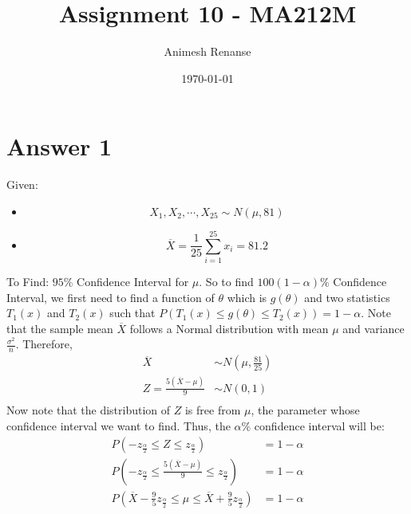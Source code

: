 \documentclass[a4paper]{article}
\title{Assignment 10 - MA212M}
\author{Animesh Renanse}
\date{\today}
\begin{document}
\maketitle
\newpage

\section{Answer 1}
Given:
\begin{itemize}
	\item {\[
				X_1,X_2,\cdots,X_{25} \sim N\left( \mu, 81 \right) 
	\] }
\item{\[
			\overline{X}	= \frac{1}{25}\sum_{i=1}^{25} x_i = 81.2
\] }
\end{itemize}
To Find: $95\%$ Confidence Interval for  $\mu$.
\newline\newline
So to find $100\left( 1-\alpha \right) \%$ Confidence Interval, we first need to find a function of $\theta$ which is $g\left( \theta \right)$ and two statistics $T_1\left( x \right) $ and $T_2\left( x \right)$ such that $P\left( T_1\left( x \right) \le  g\left( \theta \right) \le T_2\left( x \right)  \right) = 1- \alpha$.
\newline\newline
Note that the sample mean $\overline{X}$ follows a Normal distribution with mean $\mu$ and variance $\frac{\sigma^2}{n}$.
\newline\newline
Therefore,
\begin{equation*}
	\begin{split}
		\overline{X} &\sim N\left( \mu, \frac{81}{25} \right)\\
		Z = \frac{5\left( \overline{X} - \mu \right)  }{9} &\sim N\left( 0,1 \right)\\		
	\end{split}
\end{equation*}
Now note that the distribution of $Z$ is free from $\mu$, the parameter whose confidence interval we want to find. Thus, the $\alpha\%$ confidence interval will be:
 \begin{equation*}
	\begin{split}
		P\left( -z_\frac{\alpha}{2} \le Z \le z_{\frac{\alpha}{2}}\right) &= 1-\alpha\\
		P\left(  -z_\frac{\alpha}{2} \le \frac{5\left( \overline{X} - \mu\right) }{9} \le z_{\frac{\alpha}{2}} \right) &= 1-\alpha\\
		P\left( \overline{X} - \frac{9}{5}z_\frac{\alpha}{2} \le \mu \le \overline{X} + \frac{9}{5}z_\frac{\alpha}{2} \right) &= 1-\alpha 
	\end{split}
\end{equation*}
\end{document}
